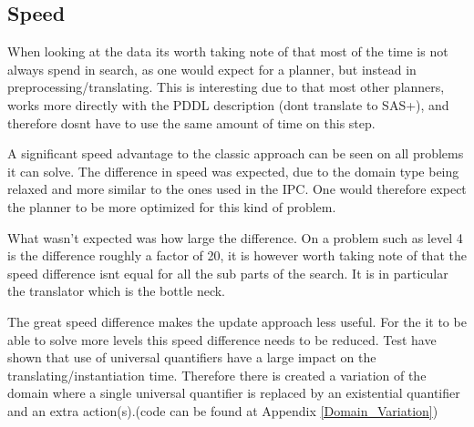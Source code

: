 			
		\subsection{Speed}
			When looking at the data its worth taking note of that most of the time is not always spend in search, as one would expect for a planner, but instead in preprocessing/translating. This is interesting due to that most other planners, works more directly with the PDDL description (dont translate to SAS+), and therefore dosnt have to use the same amount of time on this step.
		
			A significant speed advantage to the classic approach can be seen on all problems it can solve. The difference in speed was expected, due to the domain type being relaxed and more similar to the ones used in the IPC. One would therefore expect the planner to be more optimized for this kind of problem.
			

			What wasn't expected was how large the difference. On a problem such as level 4 is the difference roughly a factor of 20, it is however worth taking note of that the speed difference isnt equal for all the sub parts of the search. It is in particular the translator which is the bottle neck. 
			
			The great speed difference makes the update approach less useful. For the it to be able to solve more levels this speed difference needs to be reduced. Test have shown that use of universal quantifiers have a large impact on the translating/instantiation time. Therefore there is created a variation of the domain where a single universal quantifier is replaced by an existential quantifier and an extra action(s).(code can be found at Appendix \ref{Domain_Variation})


